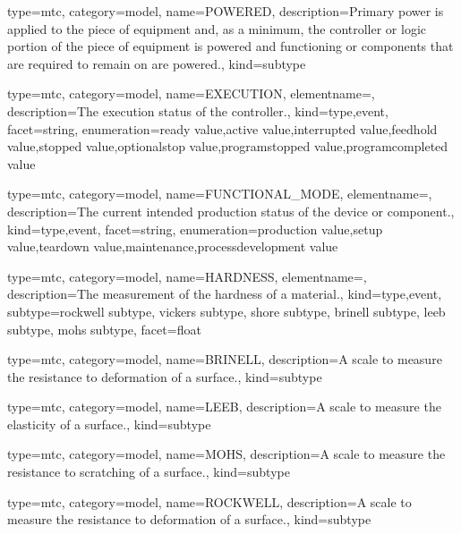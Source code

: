 {
  type=mtc,
  category=model,
  name={POWERED},
  description={Primary  power is  applied  to the  piece  of  equipment and,  as  a minimum, the controller or logic portion of the piece of equipment is powered and functioning or components that are required to remain on are powered.},
  kind={subtype}
}



{
  type=mtc,
  category=model,
  name={EXECUTION},
  elementname=,
  description={The execution status of the \gls{controller}.},
  kind={type,event},
  facet={\gls{string}},
  enumeration={\gls{ready value},\gls{active value},\gls{interrupted value},\gls{feedhold value},\gls{stopped value},\gls{optionalstop value},\gls{programstopped value},\gls{programcompleted value}}
}


{
  type=mtc,
  category=model,
  name={FUNCTIONAL\_MODE},
  elementname=,
  description={The current intended production status of the device or component.},
  kind={type,event},
  facet={\gls{string}},
  enumeration={\gls{production value},\gls{setup value},\gls{teardown value},\gls{maintenance},\gls{processdevelopment value}}
}


{
  type=mtc,
  category=model,
  name={HARDNESS},
  elementname=,
  description={The measurement of the hardness of a material.},
  kind={type,event},
  subtype={\gls{rockwell subtype}, \gls{vickers subtype}, \gls{shore subtype}, \gls{brinell subtype}, \gls{leeb subtype}, \gls{mohs subtype}},
  facet={\gls{float}}
}


{
  type=mtc,
  category=model,
  name={BRINELL},
  description={A scale to measure the resistance to deformation of a surface.},
  kind={subtype}
}


{
  type=mtc,
  category=model,
  name={LEEB},
  description={A scale to measure the elasticity of a surface.},
  kind={subtype}
}


{
  type=mtc,
  category=model,
  name={MOHS},
  description={A scale to measure the resistance to scratching of a surface.},
  kind={subtype}
}


{
  type=mtc,
  category=model,
  name={ROCKWELL},
  description={A scale to measure the resistance to deformation of a surface.},
  kind={subtype}
}


